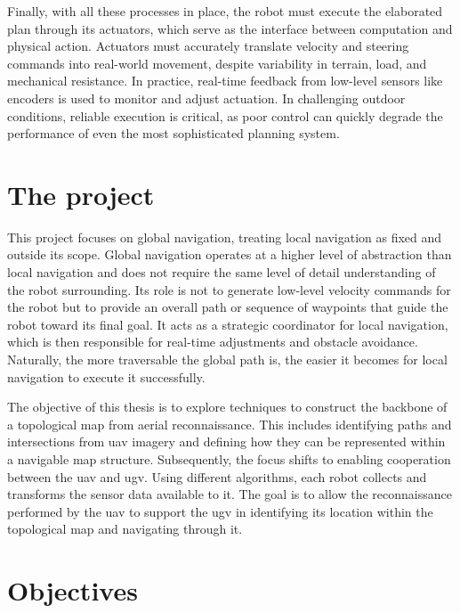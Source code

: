 Finally, with all these processes in place, the robot must execute the elaborated plan through its actuators,
which serve as the interface between computation and physical action.
Actuators must accurately translate velocity and steering commands into real-world movement, despite variability in
terrain, load, and mechanical resistance.
In practice, real-time feedback from low-level sensors like encoders is used to monitor and adjust actuation.
In challenging outdoor conditions, reliable execution is critical, as poor control can quickly degrade the performance
of even the most sophisticated planning system.



\section{The project}\label{sec:the-project}

This project focuses on global navigation, treating local navigation as fixed and outside its scope.
Global navigation operates at a higher level of abstraction than local navigation and does not require the same level of detail
understanding of the robot surrounding.
Its role is not to generate low-level velocity commands for the robot but to provide an overall path or sequence of
waypoints that guide the robot toward its final goal.
It acts as a strategic coordinator for local navigation, which is then responsible for real-time adjustments and obstacle avoidance.
Naturally, the more traversable the global path is, the easier it becomes for local navigation to execute it successfully.

The objective of this thesis is to explore techniques to construct the backbone of a topological map from aerial reconnaissance.
This includes identifying paths and intersections from \gls{uav} imagery and defining how they can be represented within a navigable map structure.
Subsequently, the focus shifts to enabling cooperation between the \gls{uav} and \gls{ugv}.
Using different algorithms, each robot collects and transforms the sensor data available to it.
The goal is to allow the reconnaissance performed by the \gls{uav} to support the \gls{ugv} in identifying its location
within the topological map and navigating through it.


\section{Objectives}

